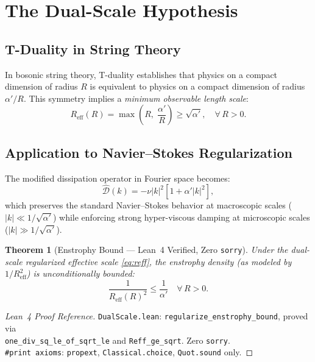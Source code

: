\documentclass[11pt,a4paper,twoside]{article}
\newtheorem{theorem}{Theorem}[section]
\newcommand{\Reff}{R_{\text{eff}}}
\newcommand{\alphap}{\alpha'}
\begin{document}
\section{The Dual-Scale Hypothesis}
\label{sec:hypothesis}

\subsection{T-Duality in String Theory}

In bosonic string theory, T-duality establishes that physics on a compact dimension of radius $R$ is equivalent to physics on a compact dimension of radius $\alphap / R$.
This symmetry implies a \emph{minimum observable length scale}:
\begin{equation}
\Reff(R) = \max\!\left(R,\;\frac{\alphap}{R}\right) \geq \sqrt{\alphap}, \quad \forall\, R > 0.
\label{eq:reff}
\end{equation}

\subsection{Application to Navier--Stokes Regularization}

The modified dissipation operator in Fourier space becomes:
\begin{equation}
\hat{\mathcal{D}}(k) = -\nu |k|^2 \left[1 + \alphap |k|^2\right],
\label{eq:dissipation}
\end{equation}
which preserves the standard Navier--Stokes behavior at macroscopic scales ($|k| \ll 1/\sqrt{\alphap}$) while enforcing strong hyper-viscous damping at microscopic scales ($|k| \gg 1/\sqrt{\alphap}$).

\begin{theorem}[Enstrophy Bound --- Lean~4 Verified, Zero \texttt{sorry}]
\label{thm:enstrophy}
Under the dual-scale regularized effective scale \eqref{eq:reff}, the enstrophy density (as modeled by $1/\Reff^2$) is unconditionally bounded:
\begin{equation}
\frac{1}{\Reff(R)^2} \leq \frac{1}{\alphap} \quad \forall\, R > 0.
\label{eq:enstrophy_bound}
\end{equation}
\end{theorem}

\begin{proof}[Lean~4 Proof Reference]
\texttt{DualScale.lean}: \texttt{regularize\_enstrophy\_bound}, proved via \\
\texttt{one\_div\_sq\_le\_of\_sqrt\_le} and \texttt{Reff\_ge\_sqrt}. Zero \texttt{sorry}. \\
\texttt{\#print axioms}: \texttt{propext}, \texttt{Classical.choice}, \texttt{Quot.sound} only.
\end{proof}
\end{document}
